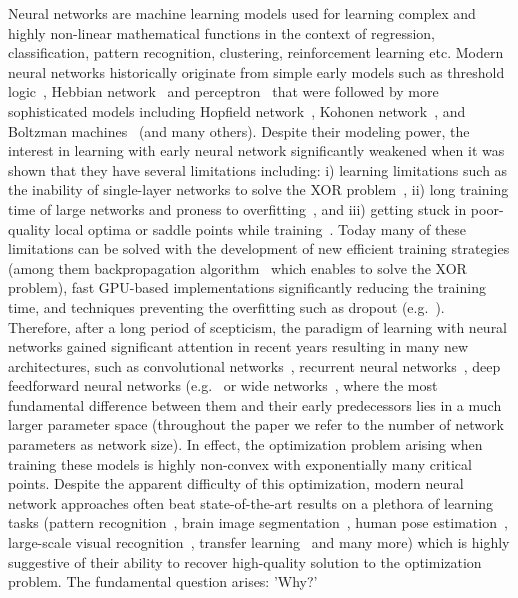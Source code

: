 \documentclass[twoside]{article}
\begin{document}
Neural networks are machine learning models used for learning complex and highly non-linear mathematical functions in the context of regression, classification, pattern recognition, clustering, reinforcement learning etc. Modern neural networks historically originate from simple early models such as threshold logic~\cite{mcculloch43a}, Hebbian network~\cite{Hebb:1949} and perceptron~\cite{rosenblatt58a} that were followed by more sophisticated models including Hopfield network~\cite{Hopfield:1988:NNP:65669.104422}, Kohonen network~\cite{Kohonen1982}, and Boltzman machines~\cite{Hinton:1986:LRB:104279.104291} (and many others). Despite their modeling power, the interest in learning with early neural network significantly weakened when it was shown that they have several limitations including: i) learning limitations such as the inability of single-layer networks to solve the XOR problem~\cite{minsky69perceptrons}, ii) long training time of large networks and proness to overfitting~\cite{JMLR:v15:srivastava14a}, and iii) getting stuck in poor-quality local optima or saddle points while training~\cite{Larochelle:2009:EST:1577069.1577070}. Today many of these limitations can be solved with the development of new efficient training strategies (among them backpropagation algorithm~\cite{Werbos:74} which enables to solve the XOR problem), fast GPU-based implementations significantly reducing the training time, and techniques preventing the overfitting such as dropout (e.g.~\cite{journals/corr/abs-1207-0580,JMLR:v15:srivastava14a}). Therefore, after a long period of scepticism, the paradigm of learning with neural networks gained significant attention in recent years resulting in many new architectures, such as convolutional networks~\cite{lecun-gradientbased-learning-applied-1998}, recurrent neural networks~\cite{Graves:2009:NCS:1525650.1525782}, deep feedforward neural networks (e.g.~\cite{DBLP:journals/corr/Schmidhuber14} or wide networks~\cite{Huang14}, where the most fundamental difference between them and their early predecessors lies in a much larger parameter space (throughout the paper we refer to the number of network parameters as network size). In effect, the optimization problem arising when training these models is highly non-convex with exponentially many critical points. Despite the apparent difficulty of this optimization, modern neural network approaches often beat state-of-the-art results on a plethora of learning tasks (pattern recognition~\cite{journals/nn/CiresanMMS12}, brain image segmentation~\cite{NIPS2012_4741}, human pose estimation~\cite{DBLP:journals/corr/TompsonJLB14}, large-scale visual recognition~\cite{sermanet-iclr-14}, transfer learning~\cite{conf/icml/GoodfellowCB12} and many more) which is highly suggestive of their ability to recover high-quality solution to the optimization problem. The fundamental question arises: 'Why?' 
\end{document}

